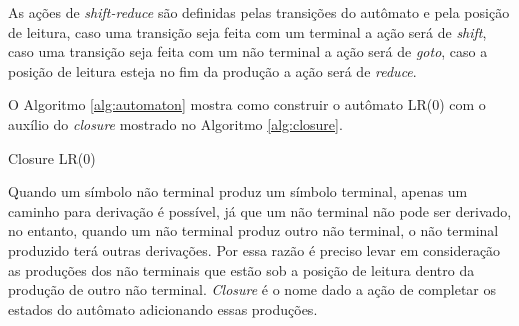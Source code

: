 As ações de \textit{shift-reduce} são definidas pelas transições do autômato e pela posição de leitura, caso uma transição seja feita com um terminal a ação será de \textit{shift}, caso uma transição seja feita com um não terminal a ação será de \textit{goto}, caso a posição de leitura esteja no fim da produção a ação será de \textit{reduce}. 

O Algoritmo \ref{alg:automaton} mostra como construir o autômato LR(0) com o auxílio do \textit{closure} mostrado no Algoritmo \ref{alg:closure}.

\begin{algorithm}[ht]
    \caption{Closure LR(0)}\label{alg:closure}
\end{algorithm}

Quando um símbolo não terminal produz um símbolo terminal, apenas um caminho para derivação é possível, já que um não terminal não pode ser derivado, no entanto, quando um não terminal produz outro não terminal, o não terminal produzido terá outras derivações. Por essa razão é preciso levar em consideração as produções dos não terminais que estão sob a posição de leitura dentro da produção de outro não terminal. \textit{Closure} é o nome dado a ação de completar os estados do autômato adicionando essas produções. 

